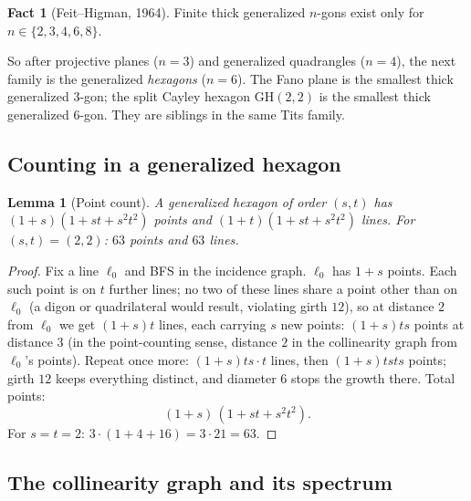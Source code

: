 \documentclass[11pt]{article}
\newtheorem{lemma}[theorem]{Lemma}
\theoremstyle{definition}
\newtheorem{fact}[theorem]{Fact}
\newcommand{\GH}{\mathrm{GH}}
\begin{document}
\begin{fact}[Feit--Higman, 1964]\label{fact:feithigman}
Finite thick generalized $n$-gons exist only for $n \in \{2,3,4,6,8\}$.
\end{fact}

So after projective planes ($n{=}3$) and generalized quadrangles ($n{=}4$),
the next family is the generalized \emph{hexagons} ($n{=}6$). The Fano plane
is the smallest thick generalized $3$-gon; the split Cayley hexagon
$\GH(2,2)$ is the smallest thick generalized $6$-gon. They are siblings in
the same Tits family.

\subsection{Counting in a generalized hexagon}

\begin{lemma}[Point count]\label{lem:hexcount}
A generalized hexagon of order $(s,t)$ has
$(1+s)(1+st+s^2t^2)$ points and $(1+t)(1+st+s^2t^2)$ lines. For
$(s,t) = (2,2)$: $63$ points and $63$ lines.
\end{lemma}

\begin{proof}
Fix a line $\ell_0$ and BFS in the incidence graph. $\ell_0$ has $1+s$
points. Each such point is on $t$ further lines; no two of these lines share
a point other than on $\ell_0$ (a digon or quadrilateral would result,
violating girth $12$), so at distance $2$ from $\ell_0$ we get
$(1+s)t$ lines, each carrying $s$ new points: $(1+s)ts$ points at distance
$3$ (in the point-counting sense, distance $2$ in the collinearity graph
from $\ell_0$'s points). Repeat once more: $(1+s)ts\cdot t$ lines, then
$(1+s)t s t s$ points; girth $12$ keeps everything distinct, and diameter
$6$ stops the growth there. Total points:
\[
(1+s)\,(1 + st + s^2t^2).
\]
For $s=t=2$: $3 \cdot (1 + 4 + 16) = 3\cdot 21 = 63$.
\end{proof}

\subsection{The collinearity graph and its spectrum}
\end{document}
